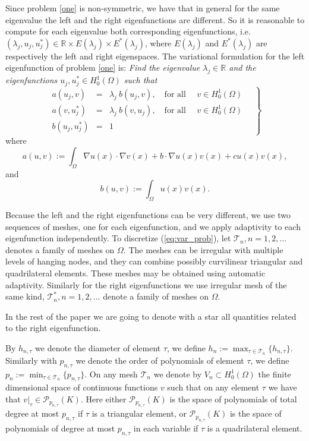 \documentclass[preprint,12pt]{elsarticle}
\newcommand{\cT}{\mathcal{T}}
\begin{document}
Since problem \eqref{one} is non-symmetric, we have that in general for the same eigenvalue the left and the right eigenfunctions are different. So it is reasonable to compute for each eigenvalue both corresponding eigenfunctions, i.e. $(\lambda_j,u_j,u_j^*)\in \mathbb{R}\times E(\lambda_j)\times E^*(\lambda_j)$, where $E(\lambda_j)$ and $E^*(\lambda_j)$ are respectively the left and right eigenspaces.
The variational formulation for the left eigenfunction of problem \eqref{one} is:
\emph{Find the eigenvalue $\lambda_j\in \mathbb{R}$ and the eigenfunctions $u_j,u_j^*\in H^1_0(\Omega)$
such that}
\begin{equation}
\label{eq:var_prob}
\left.
\begin{array}{lcl}
a(u_j,v)&=& \lambda_j\ b(u_j,v),
\quad \text{for all } \quad v  \in H^1_0(\Omega)\\
a(v,u_j^*)&=& \lambda_j\ b(v,u_j),
\quad \text{for all } \quad v  \in H^1_0(\Omega)\\
 b(u_j,u_j^*) &=& 1
\end{array}\quad
\right\}
\end{equation}
where
\begin{equation}\label{eq:a}
a(u,v):=\int_\Omega \nabla u(x)\cdot \nabla v(x) + b\cdot \nabla u(x) v(x) + cu(x)v(x),
\end{equation}
and
\begin{equation}\label{eq:b}
b(u,v):=\int_\Omega u(x) v(x).
\end{equation}



Because the left and the right eigenfunctions can be very different, we use two sequences of meshes, one for each eigenfunction, and we apply adaptivity to each eigenfunction independently. 
To discretize (\ref{eq:var_prob}), let $\cT_n, n =
1,2,\ldots $ denotes a family of meshes on $\Omega$.
The meshes can be irregular with multiple levels of hanging nodes, 
and they can combine possibly curvilinear triangular and quadrilateral 
elements. These meshes may be obtained using automatic adaptivity. 
Similarly for the right eigenfunctions we use irregular mesh of the same kind,  $\cT_n^*, n =
1,2,\ldots $ denote a family of meshes on $\Omega$.

In the rest of the paper we are going to denote with a star all quantities related to the right eigenfunction.

By $h_{n,\tau}$ we denote the diameter of element $\tau$,  
we define
$
h_n:=\max_{\tau\in \mathcal{T}_n}\{h_{n,\tau}\}.
$
Similarly with  $p_{n,\tau}$ we denote  the order of polynomials of element $\tau$,  
we define
$
p_n:=\min_{\tau\in \mathcal{T}_n}\{p_{n,\tau}\}.
$
On any mesh $\mathcal{T}_n$ we denote by $V_n \subset H^1_0(\Omega)$ the finite
dimensional space of continuous functions $v$ such that on any element $\tau$ we 
have that $v|_\tau\in \mathcal{P}_{p_{n,\tau}}(K)$. Here either $\mathcal{P}_{p_{n,\tau}}(K)$ 
is the space of polynomials of total degree at most $p_{n,\tau}$ if $\tau$ is a triangular 
element, or $\mathcal{P}_{p_{n,\tau}}(K)$ is the space of polynomials of degree at most 
$p_{n,\tau}$ in each variable if $\tau$ is a quadrilateral element.
\end{document}
